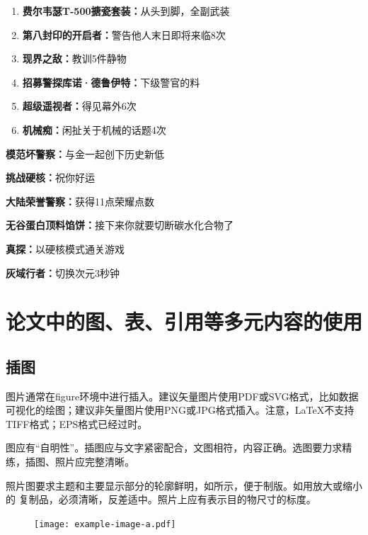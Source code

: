 \begin{enumerate}[label=(\arabic*)]
    \item \textbf{费尔韦瑟T-500搪瓷套装：}从头到脚，全副武装
    \item \textbf{第八封印的开启者：}警告他人末日即将来临8次
    \item \textbf{现界之敌：}教训5件静物
    \item \textbf{招募警探库诺·德鲁伊特：}下级警官的料
    \item \textbf{超级遥视者：}得见幕外6次
    \item \textbf{机械痴：}闲扯关于机械的话题4次
\end{enumerate}

\begin{enumerate}[label={[}\Roman*{]}]
    \item \textbf{模范坏警察：}与金一起创下历史新低
    \item \textbf{挑战硬核：}祝你好运
    \item \textbf{大陆荣誉警察：}获得11点荣耀点数
    \item \textbf{无谷蛋白顶料馅饼：}接下来你就要切断碳水化合物了
    \item \textbf{真探：}以硬核模式通关游戏
    \item \textbf{灰域行者：}切换次元3秒钟
\end{enumerate}

\clearpage
\section{论文中的图、表、引用等多元内容的使用}

\subsection{插图}\label{插图}
图片通常在figure环境中进行插入。建议矢量图片使用PDF或SVG格式，比如数据可视化的绘图；建议非矢量图片使用PNG或JPG格式插入。注意，\LaTeX{}不支持TIFF格式；EPS格式已经过时。

图应有“自明性”。插图应与文字紧密配合，文图相符，内容正确。选图要力求精练，插图、照片应完整清晰。

照片图要求主题和主要显示部分的轮廓鲜明，如所示，便于制版。如用放大或缩小的
复制品，必须清晰，反差适中。照片上应有表示目的物尺寸的标度。

\begin{figure}[htbp]
  \centering
  \texttt{[image: example-image-a.pdf]}
  \label{fig:eg1}
\end{figure}

